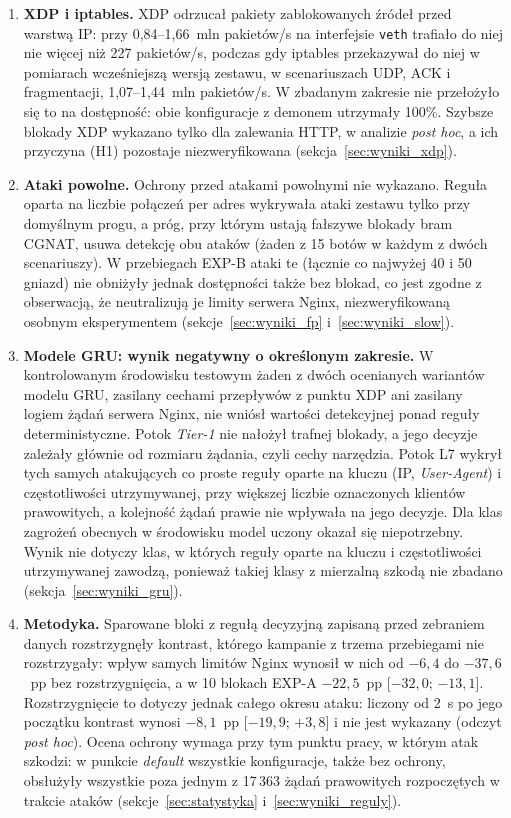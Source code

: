 \documentclass[a4paper,12pt]{article}
\begin{document}
\begin{enumerate}
    \item \textbf{XDP i iptables.} XDP odrzucał pakiety zablokowanych źródeł przed warstwą IP: przy 0,84--1,66~mln pakietów/s na interfejsie \texttt{veth} trafiało do niej nie więcej niż 227 pakietów/s, podczas gdy iptables przekazywał do niej w pomiarach wcześniejszą wersją zestawu, w scenariuszach UDP, ACK i fragmentacji, 1,07--1,44~mln pakietów/s. W zbadanym zakresie nie przełożyło się to na dostępność: obie konfiguracje z demonem utrzymały 100\%. Szybsze blokady XDP wykazano tylko dla zalewania HTTP, w analizie \textit{post hoc}, a ich przyczyna (H1) pozostaje niezweryfikowana (sekcja~\ref{sec:wyniki_xdp}).
    \item \textbf{Ataki powolne.} Ochrony przed atakami powolnymi nie wykazano. Reguła oparta na liczbie połączeń per adres wykrywała ataki zestawu tylko przy domyślnym progu, a próg, przy którym ustają fałszywe blokady bram CGNAT, usuwa detekcję obu ataków (żaden z 15 botów w każdym z dwóch scenariuszy). W przebiegach EXP-B ataki te (łącznie co najwyżej 40 i 50 gniazd) nie obniżyły jednak dostępności także bez blokad, co jest zgodne z obserwacją, że neutralizują je limity serwera Nginx, niezweryfikowaną osobnym eksperymentem (sekcje~\ref{sec:wyniki_fp} i~\ref{sec:wyniki_slow}).
    \item \textbf{Modele GRU: wynik negatywny o określonym zakresie.} W kontrolowanym środowisku testowym żaden z dwóch ocenianych wariantów modelu GRU, zasilany cechami przepływów z punktu XDP ani zasilany logiem żądań serwera Nginx, nie wniósł wartości detekcyjnej ponad reguły deterministyczne. Potok \textit{Tier-1} nie nałożył trafnej blokady, a jego decyzje zależały głównie od rozmiaru żądania, czyli cechy narzędzia. Potok L7 wykrył tych samych atakujących co proste reguły oparte na kluczu (IP, \textit{User-Agent}) i częstotliwości utrzymywanej, przy większej liczbie oznaczonych klientów prawowitych, a kolejność żądań prawie nie wpływała na jego decyzje. Dla klas zagrożeń obecnych w środowisku model uczony okazał się niepotrzebny. Wynik nie dotyczy klas, w których reguły oparte na kluczu i częstotliwości utrzymywanej zawodzą, ponieważ takiej klasy z mierzalną szkodą nie zbadano (sekcja~\ref{sec:wyniki_gru}).
    \item \textbf{Metodyka.} Sparowane bloki z regułą decyzyjną zapisaną przed zebraniem danych rozstrzygnęły kontrast, którego kampanie z trzema przebiegami nie rozstrzygały: wpływ samych limitów Nginx wynosił w nich od $-6{,}4$ do $-37{,}6$~pp bez rozstrzygnięcia, a w 10 blokach EXP-A $-22{,}5$~pp [$-32{,}0$; $-13{,}1$]. Rozstrzygnięcie to dotyczy jednak całego okresu ataku: liczony od 2~s po jego początku kontrast wynosi $-8{,}1$~pp [$-19{,}9$; $+3{,}8$] i nie jest wykazany (odczyt \textit{post hoc}). Ocena ochrony wymaga przy tym punktu pracy, w którym atak szkodzi: w punkcie \textit{default} wszystkie konfiguracje, także bez ochrony, obsłużyły wszystkie poza jednym z 17\,363 żądań prawowitych rozpoczętych w trakcie ataków (sekcje~\ref{sec:statystyka} i~\ref{sec:wyniki_reguly}).
\end{enumerate}
\end{document}
